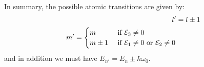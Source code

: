 \documentclass[../Main.tex]{subfiles}
\begin{document}
In summary, the possible atomic transitions are given by:
\begin{align*}
    l' &= l \pm 1 \\
    m' = 
    \begin{cases}
        m & \text{ if } \mathcal{E}_3 \neq 0 \\
        m \pm 1 & \text{ if } \mathcal{E}_1 \neq 0 \text{ or } \mathcal{E}_2 \neq 0
    \end{cases}
\end{align*}
and in addition we must have $E_{n'} = E_n \pm \hbar \omega_0$.
\end{document}
